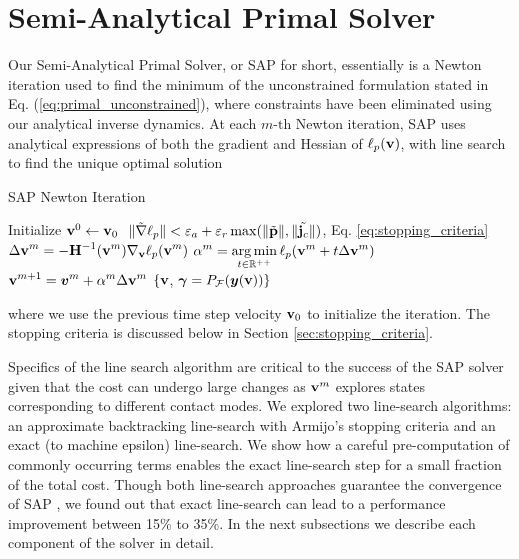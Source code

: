 
\section{Semi-Analytical Primal Solver}
\label{sec:sap_solver}

Our Semi-Analytical Primal Solver, or SAP for short, essentially is a Newton
iteration used to find the minimum of the unconstrained formulation stated in
Eq. (\ref{eq:primal_unconstrained}), where constraints have been eliminated
using our analytical inverse dynamics. At each $m\text{-th}$ Newton iteration,
SAP uses analytical expressions of both the gradient and Hessian of
$\ell_p({\mathbf{v}})$, with line search to find the unique optimal solution
\begin{algorithm}[H]
	\caption{SAP Newton Iteration}	
	\begin{algorithmic}
	\State Initialize ${\mathbf{v}}^0 \gets {\mathbf{v}}_0$
	\RepeatUntil $~\Vert\tilde{\nabla}\ell_p\Vert < \varepsilon_a + \varepsilon_r\max(\Vert\tilde{{\mathbf{p}}}\Vert,\Vert\tilde{{\mathbf{j}}_c}\Vert)$, Eq. \eqref{eq:stopping_criteria}
	\State $\displaystyle \Delta{\mathbf{v}}^{m} = -{\mathbf{H}}^{-1}({\mathbf{v}}^m)\nabla_{\mathbf{v}}\ell_p({\mathbf{v}}^m)\nonumber$
	\State $\displaystyle \alpha^m = \operatorname*{arg\,min}_{t\in\mathbb{R}^{++}} \ell_p({\mathbf{v}}^m + t \Delta{\mathbf{v}}^{m})$
	\State $\displaystyle {\mathbf{v}}^{m+1} = {\bm{v}}^m + \alpha^{m}\Delta{\mathbf{v}}^{m}$
	\EndRepeatUntil
	\State\Return $\{{\mathbf{v}}$, ${\bm\gamma}=P_\mathcal{F}({\bm{y}}({\mathbf{v}}))\}$
\end{algorithmic}
\end{algorithm}
where we use the previous time step velocity ${\mathbf{v}}_0$ to initialize the
iteration. The stopping criteria is discussed below in Section
\ref{sec:stopping_criteria}.

Specifics of the line search algorithm are critical to the success of the SAP
solver given that the cost can undergo large changes as ${\mathbf{v}}^m$ explores
states corresponding to different contact modes. We explored two line-search
algorithms: an approximate backtracking line-search with Armijo's stopping
criteria and an exact (to machine epsilon) line-search. We show how a careful
pre-computation of commonly occurring terms enables the exact line-search step
for a small fraction of the total cost. Though both line-search approaches
guarantee the convergence of SAP , we found
out that exact line-search can lead to a performance improvement between 15\% to
35\%. In the next subsections we describe each component of the solver in
detail.

